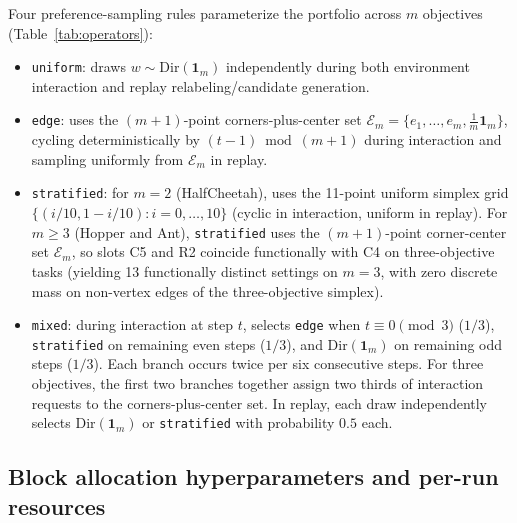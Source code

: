 Four preference-sampling rules parameterize the portfolio across $m$ objectives
(Table~\ref{tab:operators}):
\begin{itemize}[leftmargin=1.5em,itemsep=2pt,topsep=3pt]
 \item \texttt{uniform}: draws $w \sim \mathrm{Dir}(\mathbf{1}_m)$ independently
       during both environment interaction and replay relabeling/candidate
       generation.
 \item \texttt{edge}: uses the $(m+1)$-point corners-plus-center set
       $\mathcal{E}_m = \{e_1, \ldots, e_m, \frac{1}{m}\mathbf{1}_m\}$, cycling
       deterministically by $(t-1) \bmod (m+1)$ during interaction and sampling
       uniformly from $\mathcal{E}_m$ in replay.
 \item \texttt{stratified}: for $m = 2$ (HalfCheetah), uses the 11-point uniform
       simplex grid $\{(i/10, 1 - i/10) : i = 0, \ldots, 10\}$ (cyclic in
       interaction, uniform in replay). For $m \geq 3$ (Hopper and Ant),
       \texttt{stratified} uses the $(m+1)$-point corner-center set
       $\mathcal{E}_m$, so slots C5 and R2 coincide functionally with C4 on
       three-objective tasks (yielding 13 functionally distinct settings on
       $m = 3$, with zero discrete mass on non-vertex edges of the
       three-objective simplex).
 \item \texttt{mixed}: during interaction at step $t$, selects \texttt{edge}
       when $t \equiv 0 \pmod 3$ ($1/3$), \texttt{stratified} on remaining even
       steps ($1/3$), and $\mathrm{Dir}(\mathbf{1}_m)$ on remaining odd steps
       ($1/3$). Each branch occurs twice per six consecutive steps.
       For three objectives, the first two branches together assign two
       thirds of interaction requests to the corners-plus-center set.
       In replay, each draw independently selects
       $\mathrm{Dir}(\mathbf{1}_m)$ or \texttt{stratified} with probability
       $0.5$ each.
\end{itemize}

\subsection{Block allocation hyperparameters and per-run resources}

